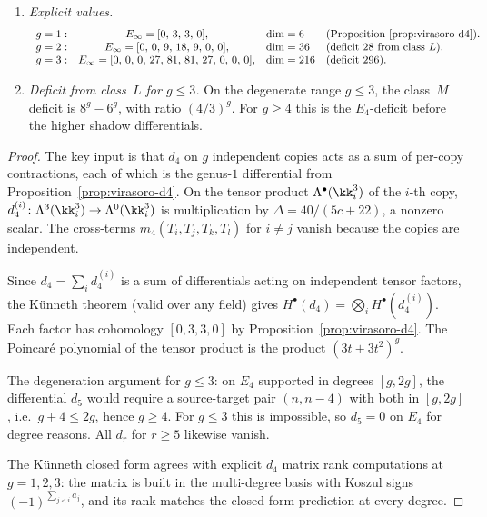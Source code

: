 \begin{corollary}
\begin{enumerate}[label=\textup{(\roman*)}]
 \item \emph{Explicit values.}
 \[
 \begin{array}{lcll}
 g = 1: & E_\infty = [0,\, 3,\, 3,\, 0], & \dim = 6 & \text{(Proposition~\ref{prop:virasoro-d4})}. \\
 g = 2: & E_\infty = [0,\, 0,\, 9,\, 18,\, 9,\, 0,\, 0], & \dim = 36 & \text{(deficit } 28 \text{ from class } L\text{)}.\\
 g = 3: & E_\infty = [0,\, 0,\, 0,\, 27,\, 81,\, 81,\, 27,\, 0,\, 0,\, 0], & \dim = 216 & \text{(deficit } 296\text{)}.
 \end{array}
 \]

 \item \emph{Deficit from class~$L$ for \(g\leq3\).} On the degenerate range \(g\leq3\), the class~$M$ deficit is \(8^g-6^g\), with ratio \((4/3)^g\). For \(g\geq4\) this is the \(E_4\)-deficit before the higher shadow differentials.
\end{enumerate}
\end{corollary}

\begin{proof}
The key input is that $d_4$ on $g$ independent copies acts as a sum of per-copy contractions, each of which is the genus-$1$ differential from Proposition~\ref{prop:virasoro-d4}. On the tensor product $\Lambda^\bullet(\kk^3_i)$ of the $i$-th copy, $d_4^{(i)} \colon \Lambda^3(\kk^3_i) \to \Lambda^0(\kk^3_i)$ is multiplication by $\Delta = 40/(5c+22)$, a nonzero scalar. The cross-terms $m_4(T_i, T_j, T_k, T_l)$ for $i \neq j$ vanish because the copies are independent.

Since $d_4 = \sum_i d_4^{(i)}$ is a sum of differentials acting on independent tensor factors, the K\"{u}nneth theorem (valid over any field) gives $H^\bullet(d_4) = \bigotimes_i H^\bullet(d_4^{(i)})$. Each factor has cohomology $[0,3,3,0]$ by Proposition~\ref{prop:virasoro-d4}. The Poincar\'{e} polynomial of the tensor product is the product $(3t + 3t^2)^g$.

The degeneration argument for $g \leq 3$: on $E_4$ supported in degrees $[g, 2g]$, the differential $d_5$ would require a source-target pair $(n, n-4)$ with both in $[g, 2g]$, i.e.\ $g + 4 \leq 2g$, hence $g \geq 4$. For $g \leq 3$ this is impossible, so $d_5 = 0$ on $E_4$ for degree reasons. All $d_r$ for $r \geq 5$ likewise vanish.

The K\"{u}nneth closed form agrees with explicit $d_4$ matrix rank
computations at $g = 1, 2, 3$: the matrix is built in the multi-degree
basis with Koszul signs $(-1)^{\sum_{j < i} a_j}$, and its rank matches
the closed-form prediction at every degree.
\end{proof}

